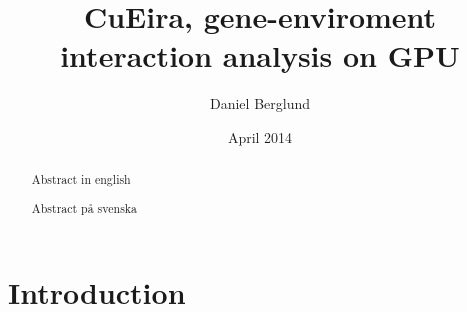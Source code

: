 \documentclass[10pt,a4paper]{article}
\title{CuEira, gene-enviroment interaction analysis on GPU}
\author{Daniel Berglund}
\date{April 2014}
\makeatletter
\newcommand\ackname{Acknowledgements}
\newenvironment{acknowledgements}{
      \titlepage
      \null\vfil
      \@beginparpenalty\@lowpenalty
      \begin{center}%
        \bfseries \ackname
        \@endparpenalty\@M
      \end{center}}%
     {\par\vfil\null\endtitlepage}
\newenvironment{acknowledgements}{
      \if@twocolumn
        \section*{\abstractname}
      \else
        \small
        \begin{center}
          {\bfseries \ackname\vspace{-.5em}\vspace{\z@}}
        \end{center}
        \quotation
      \fi}
      {\if@twocolumn\else\endquotation\fi}
\makeatother
\begin{document}
\maketitle
\thispagestyle{empty}

\clearpage
\thispagestyle{empty}
\begin{abstract}
Abstract in english
\end{abstract}

\clearpage
\thispagestyle{empty}
\begin{abstract}
Abstract på svenska
\end{abstract}

\clearpage
\thispagestyle{empty}

\thispagestyle{empty}
\tableofcontents

\newpage
\setcounter{page}{1}
\section{Introduction}


\end{document}
